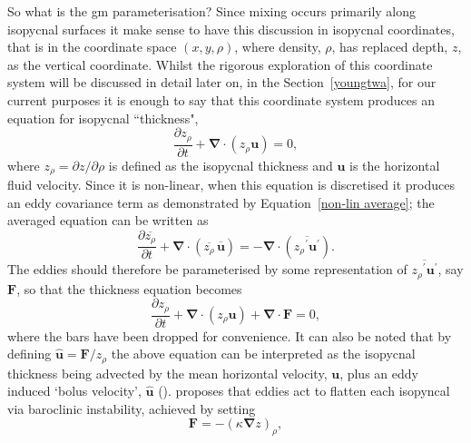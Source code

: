 \documentclass[12pt,a4paper]{report}
\newcommand*\mean[1]{\overline{#1}}
\newcommand*\res[1]{{#1}^{\prime}}
\newcommand*\equref[1]{Equation~\eqref{#1}}
\newcommand*\secref[1]{Section~\ref{#1}}
\begin{document}
 So what is the \gls{gm} parameterisation? Since mixing occurs primarily
 along isopycnal surfaces it make sense to have this discussion in
 isopycnal coordinates, that is in the coordinate space $(x,y,\rho)$,
  where density, $\rho$, has replaced depth, $z$, as the vertical
  coordinate. Whilst the rigorous exploration of this coordinate system
  will be discussed in detail later on, in the \secref{youngtwa}, for our current purposes 
  it is enough to say that this coordinate system produces an equation
  for isopycnal ``thickness",
  \begin{equation}
  \label{cont}
  \frac{\partial z_{\rho}}{\partial t} + \boldsymbol{\nabla}\cdot\left(z_{\rho}\boldsymbol{u}\right) = 0,
  \end{equation}
  where $z_{\rho} = {\partial z}/{\partial \rho}$ is defined as the
   isopycnal thickness and $\boldsymbol{u}$ is the horizontal fluid
   velocity. Since it is non-linear, when this equation is discretised
   it produces an eddy covariance term as demonstrated by 
   \equref{non-lin average}; the averaged equation can be written as
     \begin{equation}
     \frac{\partial \mean{z_{\rho}}}{\partial t} + \boldsymbol{\nabla}\cdot\left(\mean{z_{\rho}} \, \mean{\boldsymbol{u}}\right) = - \boldsymbol{\nabla}\cdot\left(\mean{\res{z_{\rho}} \res{\boldsymbol{u}}}\right).
     \label{meancont}
     \end{equation}
   The eddies should therefore be parameterised by some representation
   of $\mean{\res{z_{\rho}} \res{\boldsymbol{u}}}$, say $\boldsymbol{F}$,
   so that the thickness equation becomes
     \begin{equation}
     \frac{\partial z_{\rho}}{\partial t} + \boldsymbol{\nabla}\cdot\left(z_{\rho}\boldsymbol{u}\right) + \boldsymbol{\nabla}\cdot\boldsymbol{F} = 0,
     \label{thicknessgeneralparam}
     \end{equation}
    where the bars have been dropped for convenience. It can also 
    be noted that by defining $\hat{\boldsymbol{u}} = \boldsymbol{F}/z_{\rho}$ the above equation can be interpreted as
    the isopycnal thickness
    being advected by the mean horizontal velocity, $\boldsymbol{u}$, 
    plus an eddy induced
    `bolus velocity', $\hat{\boldsymbol{u}}$ (\cite{gent1995parameterizing}). \cite{gent1990} proposes that eddies act to flatten each
    isopyncal via baroclinic instability, achieved by
    setting 
    \begin{equation}
    \boldsymbol{F} = - \left(\kappa
        \boldsymbol{\nabla} z \right)_{\rho},
    \end{equation}
\end{document}
